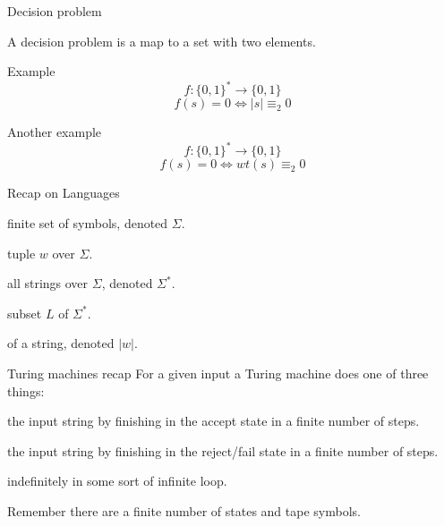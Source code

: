 \begin{frame}{Decision problem}

    A decision problem is a map to a set with two elements.

  \vspace{4mm}
  \begin{exampleblock}{Example}
    \[ f: \{0,1\}^* \rightarrow \{0,1\} \]
    \[ f(s) = 0 \Leftrightarrow |s| \equiv_2 0 \]
  \end{exampleblock}

  \vspace{4mm}
  \begin{exampleblock}{Another example}
   \[ f: \{0,1\}^* \rightarrow \{0,1\} \]
   \[ f(s) = 0 \Leftrightarrow wt(s) \equiv_2 0 \]
  \end{exampleblock}
\end{frame}


\begin{frame}{Recap on Languages}
  \begin{description}
    \setlength\itemsep{6mm}
    \item[Alphabet:] finite set of symbols, denoted \( \Sigma \).
    \item[String:] tuple \( w \) over \( \Sigma \).
    \item[Star:] all strings over \( \Sigma \), denoted \( \Sigma^* \).
    \item[Language:] subset \( L \) of \( \Sigma^* \).
    \item[Length:] of a string, denoted \( |w| \).
  \end{description}
\end{frame}


\begin{frame}{Turing machines recap}
  For a given input a Turing machine does one of three things:
  \vspace{4mm}
  \begin{description}
    \setlength\itemsep{6mm}
    \item[Accepts] the input string by finishing in the accept state in a finite number of steps.
    \item[Rejects] the input string by finishing in the reject/fail state in a finite number of steps.
    \item[Continues] indefinitely in some sort of infinite loop.
  \end{description}
  \vspace{4mm}
  Remember there are a finite number of states and tape symbols.
\end{frame}



